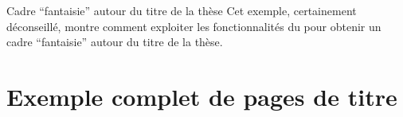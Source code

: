 \begin{dbexample}{Cadre \enquote{fantaisie} autour du titre de la thèse}{}
  Cet exemple, certainement déconseillé, montre comment exploiter les
  fonctionnalités du  pour obtenir un cadre
  \enquote{fantaisie} autour du titre de la thèse.%
  \NoAutoSpacing%
\begin{preamblecode}
\maketitle[frametitle={colback=red!50!white,beamer}]
\end{preamblecode}
\end{dbexample}

\section{Exemple complet de pages de titre}
\label{sec-exemple-complet}

